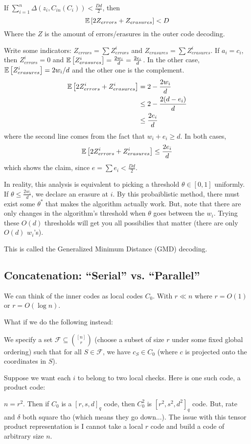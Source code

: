 \begin{theorem}
    If $\sum_{i = 1}^n \Delta(z_i, C_{in}(C_i)) < \frac{Dd}{2}$, then
    \[ \mathbb{E}\left[ 2Z_{errors} + Z_{erasures} \right] < D \]
    Where the $Z$ is the amount of errors/erasures in the outer code decoding.
    \begin{proof*}
        Write some indicators: $Z_{errors} = \sum Z_{errors}^i$ and $Z_{erasures} = \sum Z_{erasures}^i$.
        If $a_i = c_i$, then $Z_{errors}^i = 0$ and $\mathbb{E}\left[ Z_{erasures}^{i} \right] = \frac{2w_i}{d} = \frac{2e_i}{d}$.
        In the other case, $\mathbb{E}\left[ Z_{erasures}^i \right] = 2w_i/d$ and the other one is the complement.
        \begin{align*}
            \mathbb{E}\left[ 2 Z_{errors}^i + Z_{erasures}^i \right] &= 2 - \frac{2w_i}{d} \\
            &\leq 2 - \frac{2(d - e_i)}{d} \\
            &\leq \frac{2e_i}{d}
        \end{align*}
        where the second line comes from the fact that $w_i + e_i \geq d$.
        In both cases,
        \[ \mathbb{E}\left[ 2 Z_{errors}^i + Z_{erasures}^i \right] \leq \frac{2e_i}{d} \]
        which shows the claim, since $e = \sum e_i < \frac{Dd}{2}$.
    \end{proof*}
\end{theorem}

In reality, this analysis is equivalent to picking a threshold $\theta \in [0, 1]$ uniformly.
If $\theta \leq \frac{2w_i}{d}$, we declare an erasure at $i$. By this probaiblistic method,
there must exist some $\theta^*$ that makes the algorithm actually work. But, note that there are only changes in the algorithm's threshold
when $\theta$ goes between the $w_i$. Trying these $O(d)$ thresholds will get you all possibilies that matter (there are only $O(d)$ $w_i$'s).

This is called the Generalized Minimum Distance (GMD) decoding.
\subsection{Concatenation: ``Serial'' vs. ``Parallel''}
We can think of the inner codes as local codes $C_0$. With $r \ll n$ where $r = O(1)$ or $r = O(\log n)$.


What if we do the following instead:


We specify a set $\mathcal{F} \subseteq \binom{[n]}{r}$ (choose a subset of size $r$ under some fixed global ordering)
such that for all $S \in \mathcal{F}$, we have $c_S \in C_0$ (where $c$ is projected onto the coordinates in $S$).

Suppose we want each $i$ to belong to two local checks. Here is one such code, a product code:


$n = r^2$. Then if $C_0$ is a $[r, s, d]_q$ code, then $C_0^2$ is $[r^2, s^2, d^2]_q$ code. But, rate and $\delta$ both square tho (which means they go down...).
The issue with this tensor product representation is I cannot take a local $r$ code and build a code of arbitrary size $n$.
